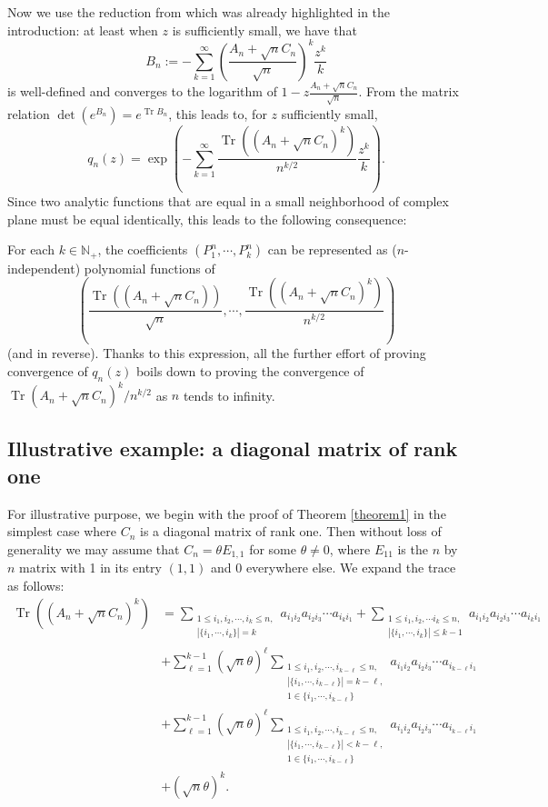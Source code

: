 \documentclass[12pt, reqno]{amsart}
\theoremstyle{definition}
\theoremstyle{remark}
\numberwithin{equation}{section}
\begin{document}
Now we use the reduction from \cite{bordenave2021convergence}which was already highlighted in the introduction: at least when $z$ is sufficiently small, we have that 
$$B_n:=-\sum_{k=1}^\infty (\frac{A_n+\sqrt{n}C_n}{\sqrt{n}})^k\frac{z^k}{k}$$
is well-defined and converges to the logarithm of $1-z\frac{A_n+\sqrt{n}C_n}{\sqrt{n}}.$ From the matrix relation $\det(e^{B_n})=e^{\operatorname{Tr}B_n}$, this leads to, for $z$ sufficiently small, 
$$
q_n(z)=\exp\left(-\sum_{k=1}^\infty \frac{\operatorname{Tr}((A_n+\sqrt{n}C_n)^k)}{n^{k/2}}\frac{z^k}{k}
\right).
$$ Since two analytic functions that are equal in a small neighborhood of complex plane must be equal identically, this leads to the following consequence:

For each $k\in\mathbb{N}_+$, the coefficients $(P_1^n,\cdots,P_k^n)$ can be represented as ($n$-independent) polynomial functions of $$\left(\frac{\operatorname{Tr}((A_n+\sqrt{n}C_n))}{\sqrt{n}},\cdots,\frac{\operatorname{Tr}((A_n+\sqrt{n}C_n)^k)}{n^{k/2}}\right)$$ (and in reverse). Thanks to this expression, all the further effort of proving convergence of $q_n(z)$ boils down to proving the convergence of $\operatorname{Tr}(A_n+\sqrt{n}C_n)^k/n^{k/2}$ as $n$ tends to infinity.


\subsection{Illustrative example: a diagonal matrix of rank one}


For illustrative purpose, we begin with the proof of Theorem \ref{theorem1} in the simplest case where $C_n$ is a diagonal matrix of rank one. Then without loss of generality we may assume that $C_n=\theta E_{1,1}$ for some $\theta\neq 0$, where $E_{11}$ is the $n$ by $n$ matrix with 1 in its entry $(1,1)$ and $0$ everywhere else. We expand the trace as follows:
\begin{equation}\label{traceexpansion}\begin{aligned}
\operatorname{Tr}((A_n+\sqrt{n}C_n)^k)&=\sum_{\substack{1\leq i_1,i_2,\cdots, i_k\leq n,\\|\{i_1,\cdots,i_k\}|=k}}a_{i_1i_2}a_{i_2i_3}\cdots a_{i_ki_1}+\sum_{\substack{1\leq i_1,i_2,\cdots i_k\leq n,\\ |\{i_1,\cdots,i_k\}|\leq k-1}} a_{i_1i_2}a_{i_2i_3}\cdots a_{i_ki_1}\\
&+\sum_{\ell=1}^{k-1}(\sqrt{n}\theta)^\ell 
\sum_{\substack{1\leq i_1,i_2,\cdots, i_{k-\ell}\leq n,\\|\{i_1,\cdots,i_{k-\ell}\}|=k-\ell,\\ 1\in \{i_1,\cdots,i_{k-\ell}\}}}a_{i_1i_2}a_{i_2i_3}\cdots a_{i_{k-\ell} i_1}\\&+\sum_{\ell=1}^{k-1}(\sqrt{n}\theta)^\ell 
\sum_{\substack{1\leq i_1,i_2,\cdots, i_{k-\ell}\leq n,\\|\{i_1,\cdots,i_{k-\ell}\}|<k-\ell,\\ 1\in \{i_1,\cdots,i_{k-\ell}\}}}a_{i_1i_2}a_{i_2i_3}\cdots a_{i_{k-\ell} i_1}\\&+(\sqrt{n}\theta)^k.
\end{aligned}
\end{equation}
\end{document}

